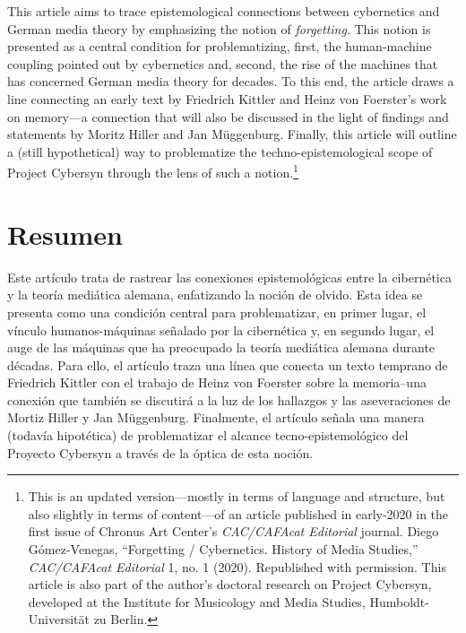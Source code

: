 \documentclass{tufte-handout}
\begin{document}
\begin{titlepage}
This article aims to trace epistemological connections between
cybernetics and German media theory by emphasizing the notion of
\emph{forgetting}. This notion is presented as a central condition for
problematizing, first, the human-machine coupling pointed out by
cybernetics and, second, the rise of the machines that has concerned
German media theory for decades. To this end, the article draws a line
connecting an early text by Friedrich Kittler and Heinz von Foerster's
work on memory---a connection that will also be discussed in the light
of findings and statements by Moritz Hiller and Jan Müggenburg. Finally,
this article will outline a (still hypothetical) way to problematize the
techno-epistemological scope of Project Cybersyn through the lens of
such a notion.\footnote{This is an updated version---mostly in terms of
  language and structure, but also slightly in terms of content---of an
  article published in early-2020 in the first issue of Chronus Art
  Center's \emph{CAC/CAFAcat Editorial} journal. Diego Gómez-Venegas,
  ``Forgetting / Cybernetics. History of Media Studies,''
  \emph{CAC/CAFAcat Editorial} 1, no. 1 (2020). Republished with
  permission. This article is also part of the author's doctoral
  research on Project Cybersyn, developed at the Institute for
  Musicology and Media Studies, Humboldt-Universität zu Berlin.}

  \hypertarget{resumen}{%
\section{Resumen}\label{resumen}}

Este artículo trata de rastrear las conexiones epistemológicas entre la cibernética y la teoría mediática alemana, enfatizando la noción de olvido. Esta idea se presenta como una condición central para problematizar, en primer lugar, el vínculo humanos-máquinas señalado por la cibernética y, en segundo lugar, el auge de las máquinas que ha preocupado la teoría mediática alemana durante décadas. Para ello, el artículo traza una línea que conecta un texto temprano de Friedrich Kittler con el trabajo de Heinz von Foerster sobre la memoria--una conexión que también se discutirá a la luz de los hallazgos y las aseveraciones de Mortiz Hiller y Jan Müggenburg. Finalmente, el artículo señala una manera (todavía hipotética) de problematizar el alcance tecno-epistemológico del Proyecto Cybersyn a través de la óptica de esta noción. 




\enlargethispage{2\baselineskip}

\vspace{1em}



 \end{titlepage}
\end{document}
